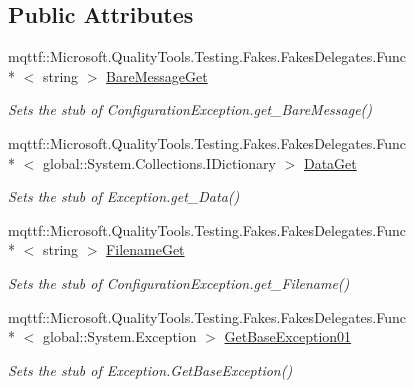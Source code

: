 \subsection*{Public Attributes}
\begin{DoxyCompactItemize}
\item 
mqttf\-::\-Microsoft.\-Quality\-Tools.\-Testing.\-Fakes.\-Fakes\-Delegates.\-Func\\*
$<$ string $>$ \hyperlink{class_system_1_1_configuration_1_1_fakes_1_1_stub_configuration_exception_af867dd8562d4d5ddfd6b52d61b7f1c69}{Bare\-Message\-Get}
\begin{DoxyCompactList}\small\item\em Sets the stub of Configuration\-Exception.\-get\-\_\-\-Bare\-Message()\end{DoxyCompactList}\item 
mqttf\-::\-Microsoft.\-Quality\-Tools.\-Testing.\-Fakes.\-Fakes\-Delegates.\-Func\\*
$<$ global\-::\-System.\-Collections.\-I\-Dictionary $>$ \hyperlink{class_system_1_1_configuration_1_1_fakes_1_1_stub_configuration_exception_a288951ec9f04cef4bb671683eaa4bfc7}{Data\-Get}
\begin{DoxyCompactList}\small\item\em Sets the stub of Exception.\-get\-\_\-\-Data()\end{DoxyCompactList}\item 
mqttf\-::\-Microsoft.\-Quality\-Tools.\-Testing.\-Fakes.\-Fakes\-Delegates.\-Func\\*
$<$ string $>$ \hyperlink{class_system_1_1_configuration_1_1_fakes_1_1_stub_configuration_exception_abe0d4d141a8b3a4d0f6a5823b59a5f48}{Filename\-Get}
\begin{DoxyCompactList}\small\item\em Sets the stub of Configuration\-Exception.\-get\-\_\-\-Filename()\end{DoxyCompactList}\item 
mqttf\-::\-Microsoft.\-Quality\-Tools.\-Testing.\-Fakes.\-Fakes\-Delegates.\-Func\\*
$<$ global\-::\-System.\-Exception $>$ \hyperlink{class_system_1_1_configuration_1_1_fakes_1_1_stub_configuration_exception_a7c0c376b4fa0cdad18dcc30c8b811277}{Get\-Base\-Exception01}
\begin{DoxyCompactList}\small\item\em Sets the stub of Exception.\-Get\-Base\-Exception()\end{DoxyCompactList}\item 

\end{DoxyCompactItemize}
